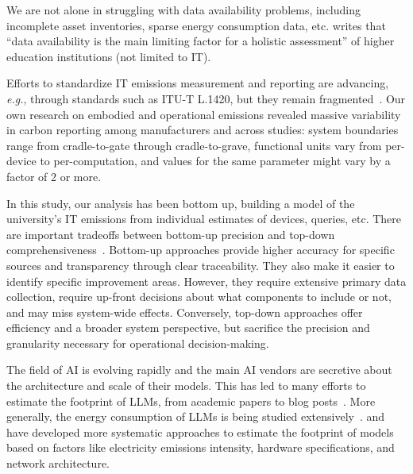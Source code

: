 \documentclass[11pt]{article}
\newcommand{\eg}{{\em e.g.}}
\begin{document}
We are not alone in struggling with data availability problems, including incomplete asset inventories, sparse energy consumption data, etc. \textcite{jurgens:2023} writes that ``data availability is the main limiting factor for a holistic assessment'' of higher education institutions (not limited to IT).

Efforts to standardize IT emissions measurement and reporting are advancing, \eg, through standards such as ITU-T L.1420, but they remain fragmented~\cite{wb:itu:ict}. Our own research on embodied and operational emissions revealed massive variability in carbon reporting among manufacturers and across studies: system boundaries range from cradle-to-gate through cradle-to-grave, functional units vary from per-device to per-computation, and values for the same parameter might vary by a factor of 2 or more.

In this study, our analysis has been bottom up, building a model of the university's IT emissions from individual estimates of devices, queries, etc. There are important tradeoffs between bottom-up precision and top-down comprehensiveness~\cite{hilty:2009:lca}. Bottom-up approaches provide higher accuracy for specific sources and transparency through clear traceability. They also make it easier to identify specific improvement areas. However, they require extensive primary data collection, require up-front decisions about what components to include or not, and may miss system-wide effects. Conversely, top-down approaches offer efficiency and a broader system perspective, but sacrifice the precision and granularity necessary for operational decision-making. 

The field of AI is evolving rapidly and the main AI vendors are secretive about the architecture and scale of their models. This has led to many efforts to estimate the footprint of LLMs, from academic papers to blog posts~\cite{devries2023growing,heguerte2023estimate,luccioni2022estimating,ritchie:chatgpt,epoch2025howmuchenergydoeschatgptuse}. More generally, the energy consumption of LLMs is being studied extensively~\cite{budennyy2022eco2ai,castano2023exploring,epoch2024optimallyallocatingcomputebetweeninferenceandtraining,gowda2024watt,harding2024watts,luccioni2023counting,patterson2021carbon,rodriguez2024evaluating,tripp2024measuring}. \textcite{lacoste:mlco2} and \textcite{faiz2024llmcarbon} have developed more systematic approaches to estimate the footprint of models based on factors like electricity emissions intensity, hardware specifications, and network architecture.
\end{document}
